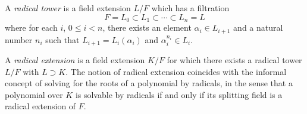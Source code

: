 \documentclass{article}
\begin{document}
A {\em radical tower} is a field extension $L/F$ which has a filtration
$$
F = L_0 \subset L_1 \subset \cdots \subset L_n = L
$$
where for each $i$, $0 \leq i < n$, there exists an element $\alpha_i \in L_{i+1}$ and a natural number $n_i$ such that $L_{i+1} = L_i(\alpha_i)$ and $\alpha_i^{n_i} \in L_i$.

A {\em radical extension} is a field extension $K/F$ for which there exists a radical tower $L/F$ with $L \supset K$. The notion of radical extension coincides with the informal concept of solving for the roots of a polynomial by radicals, in the sense that a polynomial over $K$ is solvable by radicals if and only if its splitting field is a radical extension of $F$.
\end{document}
